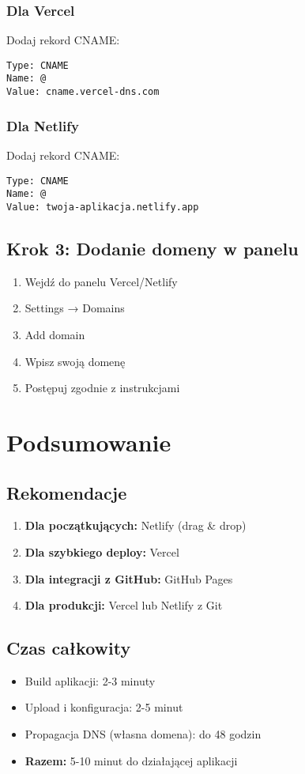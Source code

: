\documentclass[12pt,a4paper]{article}
\begin{document}
\subsubsection{Dla Vercel}
Dodaj rekord CNAME:
\begin{verbatim}
Type: CNAME
Name: @
Value: cname.vercel-dns.com
\end{verbatim}

\subsubsection{Dla Netlify}
Dodaj rekord CNAME:
\begin{verbatim}
Type: CNAME
Name: @
Value: twoja-aplikacja.netlify.app
\end{verbatim}

\subsection{Krok 3: Dodanie domeny w panelu}
\begin{enumerate}
    \item Wejdź do panelu Vercel/Netlify
    \item Settings → Domains
    \item Add domain
    \item Wpisz swoją domenę
    \item Postępuj zgodnie z instrukcjami
\end{enumerate}

\section{Podsumowanie}

\subsection{Rekomendacje}
\begin{enumerate}
    \item \textbf{Dla początkujących:} Netlify (drag \& drop)
    \item \textbf{Dla szybkiego deploy:} Vercel
    \item \textbf{Dla integracji z GitHub:} GitHub Pages
    \item \textbf{Dla produkcji:} Vercel lub Netlify z Git
\end{enumerate}

\subsection{Czas całkowity}
\begin{itemize}
    \item Build aplikacji: 2-3 minuty
    \item Upload i konfiguracja: 2-5 minut
    \item Propagacja DNS (własna domena): do 48 godzin
    \item \textbf{Razem:} 5-10 minut do działającej aplikacji
\end{itemize}
\end{document}
